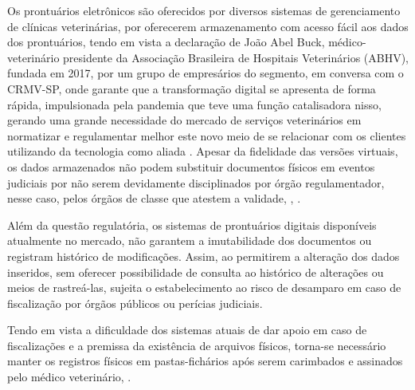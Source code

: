 \documentclass[
    12pt,               %
    openright,          %
    oneside,
    a4paper,            %
    BIBLATEX,           %
    TODO,               %
    english,            %
    brazil              %
    ]{ifsp-spo-inf-ctds}
\begin{document}
    Os prontuários eletrônicos são oferecidos por diversos sistemas de gerenciamento de clínicas veterinárias, por oferecerem armazenamento com acesso fácil aos dados dos prontuários, tendo em vista a declaração de João Abel Buck, médico-veterinário presidente da Associação Brasileira de Hospitais Veterinários (ABHV), fundada em 2017, por um grupo de empresários do segmento, em conversa com o CRMV-SP, onde garante que a transformação digital se apresenta de forma rápida, impulsionada pela pandemia que teve uma função catalisadora nisso, gerando uma grande necessidade do mercado de serviços veterinários em normatizar e regulamentar melhor este novo meio de se relacionar com os clientes utilizando da tecnologia como aliada \cite{buck}. Apesar da fidelidade das versões virtuais, os dados armazenados não podem substituir documentos físicos em eventos judiciais por não serem devidamente disciplinados por órgão regulamentador, nesse caso, pelos órgãos de classe que atestem a validade, , .

    Além da questão regulatória, os sistemas de prontuários digitais disponíveis atualmente no mercado, não garantem a imutabilidade dos documentos ou registram histórico de modificações. Assim, ao permitirem a alteração dos dados inseridos, sem oferecer possibilidade de consulta ao histórico de alterações ou meios de rastreá-las, sujeita o estabelecimento ao risco de desamparo em caso de fiscalização por órgãos públicos ou perícias judiciais.
    
    Tendo em vista a dificuldade dos sistemas atuais de dar apoio em caso de fiscalizações e a premissa da existência de arquivos físicos, torna-se necessário manter os registros físicos em pastas-fichários após serem carimbados e assinados pelo médico veterinário, .
    
\end{document}
